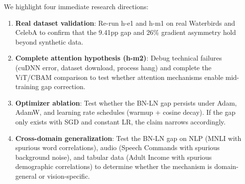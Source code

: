 We highlight four immediate research directions:

\begin{enumerate}
\item \textbf{Real dataset validation}: Re-run h-e1 and h-m1 on real Waterbirds and CelebA to confirm that the 9.41pp gap and 26\% gradient asymmetry hold beyond synthetic data.

\item \textbf{Complete attention hypothesis (h-m2)}: Debug technical failures (cuDNN error, dataset download, process hang) and complete the ViT/CBAM comparison to test whether attention mechanisms enable mid-training gap correction.

\item \textbf{Optimizer ablation}: Test whether the BN-LN gap persists under Adam, AdamW, and learning rate schedules (warmup + cosine decay). If the gap only exists with SGD and constant LR, the claim narrows accordingly.

\item \textbf{Cross-domain generalization}: Test the BN-LN gap on NLP (MNLI with spurious word correlations), audio (Speech Commands with spurious background noise), and tabular data (Adult Income with spurious demographic correlations) to determine whether the mechanism is domain-general or vision-specific.
\end{enumerate}
